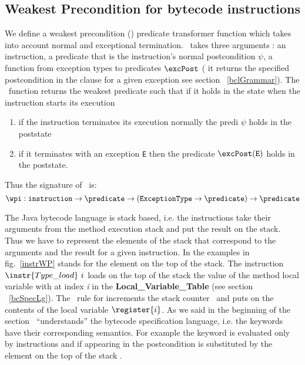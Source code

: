 \subsection{Weakest Precondition for bytecode instructions}\label{wpInstr}
We define a weakest precondition (\wpi) predicate transformer function which takes into account normal and exceptional termination. 
\wpi \ takes three arguments : an instruction, a predicate that is the instruction's normal postcondition $\psi$, a function
from exception types to predicates $\excPost$ ( it returns the specified postcondition in the  clause for a given exception see section ~\ref{bclGrammar}).
The \wpi \ function returns the weakest predicate such that if it holds in the state when the instruction starts its execution 
\begin{enumerate}
	\item if the instruction terminates its execution normally the predi $\psi$ holds in the poststate 
	\item if it terminates with an exception \texttt{E} then the predicate $\excPost(\tt{E})$ holds in the poststate.
\end{enumerate}
 Thus the signature of \wpi \ is:
$$\wpi : \texttt{instruction} \rightarrow \predicate \rightarrow (\tt{ ExceptionType} \rightarrow  \predicate) \rightarrow \predicate   $$

 The Java bytecode language is stack based, i.e. the instructions take their arguments from the method execution stack and 
 put the result on the stack. Thus we have to represent the elements of the stack that correspond to the arguments and the result for a given instruction. 
 In the examples in fig.~\ref{instrWP} \stack{\counter} stands for the element on the top of the stack. 
 The instruction $\instr{Type\_load} \ i$  loads on the top of the stack the value of the method local variable with at index \textit{i}
 in the \textbf{Local\_Variable\_Table} (see section ~\ref{bcSpecLg}). The \wpi \ rule for   increments the stack
counter \counter \ and puts on \stack{\counter} the contents of the local variable $\register{i}$.
As we said in the beginning of the section \wpi \ ``understands'' the bytecode specification language, i.e. the keywords have their 
corresponding semantics. For example the keyword  is evaluated only by  
instructions and if appearing in the postcondition   is substituted by the element on the top of 
the stack \stack{\counter}. 

